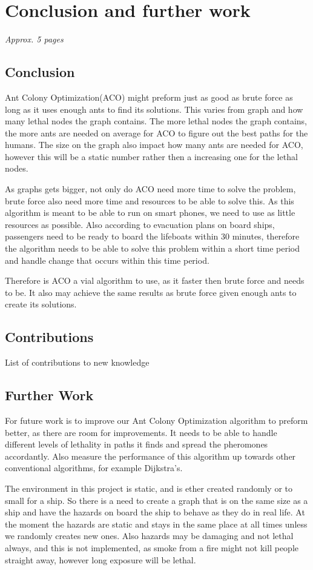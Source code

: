 \chapter{Conclusion and further work}
\label{ch:conclusion}
\textit{Approx. 5 pages}



\section{Conclusion}
Ant Colony Optimization(ACO) might preform just as good as brute force as long as it uses enough ants to find its solutions. This varies from graph and how many lethal nodes the graph contains. The more lethal nodes the graph contains, the more ants are needed on average for ACO to figure out the best paths for the humans. The size on the graph also impact how many ants are needed for ACO, however this will be a static number rather then a increasing one for the lethal nodes. 

As graphs gets bigger, not only do ACO need more time to solve the problem, brute force also need more time and resources to be able to solve this. As this algorithm is meant to be able to run on smart phones, we need to use as little resources as possible. Also according to evacuation plans on board ships, passengers need to be ready to board the lifeboats within 30 minutes, therefore the algorithm needs to be able to solve this problem within a short time period and handle change that occurs within this time period.

Therefore is ACO a vial algorithm to use, as it faster then brute force and needs to be. It also may achieve the same results as brute force given enough ants to create its solutions.


\section{Contributions}
List of contributions to new knowledge

\section{Further Work}

For future work is to improve our Ant Colony Optimization algorithm to preform better, as there are room for improvements. It needs to be able to handle different levels of lethality in paths it finds and spread the pheromones accordantly. Also measure the performance of this algorithm up towards other conventional algorithms, for example Dijkstra's.

The environment in this project is static, and is ether created randomly or to small for a ship. So there is a need to create a graph that is on the same size as a ship and have the hazards on board the ship to behave as they do in real life. At the moment the hazards are static and stays in the same place at all times unless we randomly creates new ones. Also hazards may be damaging and not lethal always, and this is not implemented, as smoke from a fire might not kill people straight away, however long exposure will be lethal.